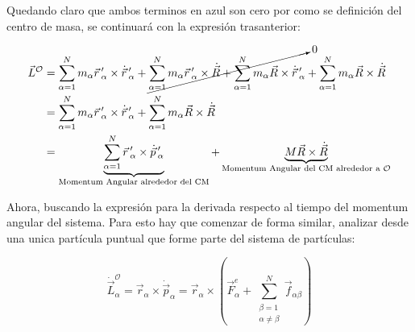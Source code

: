 \documentclass[/home/hernan-barquero/Documents/Apuntes_mecanica_teorica/main.tex]{subfiles}
\begin{document}
	Quedando claro que ambos terminos en azul son cero por como se definición del centro de masa, se continuará con la expresión trasanterior:

	\begin{align*}
		\vec{L}^{\mathcal{O}} &= \sum_{\alpha =1}^{N} m_{\alpha} {\vec{r}}\,'_{\alpha} \times {\dot{\vec{r}}}\,'_{\alpha} + \cancelto{0}{\sum_{\alpha =1}^{N} m_{\alpha} {\vec{r}}\,'_{\alpha} \times \dot{\vec{R}} + \sum_{\alpha =1}^{N} m_{\alpha} \vec{R} \times {\dot{\vec{r}}}\,'_{\alpha}} + \sum_{\alpha =1}^{N} m_{\alpha}  \vec{R} \times \dot{\vec{R}} \\ 
		& = \sum_{\alpha =1}^{N} m_{\alpha} {\vec{r}}\,'_{\alpha} \times {\dot{\vec{r}}}\,'_{\alpha} + \sum_{\alpha =1}^{N} m_{\alpha}  \vec{R} \times \dot{\vec{R}} \\ 
		& = \underbrace{\sum_{\alpha =1}^{N} {\vec{r}}\,'_{\alpha} \times {\dot{\vec{p}}}\,'_{\alpha}}_{\textup{Momentum Angular alrededor del CM}} + \underbrace{M \vec{R} \times \dot{\vec{R}}}_{\textup{Momentum Angular del CM alrededor a $\mathcal{O}$}}
	\end{align*}

	Ahora, buscando la expresión para la derivada respecto al tiempo del momentum angular del sistema. Para esto hay que comenzar de forma similar, analizar desde una unica partícula puntual que forme parte del sistema de partículas:

	\begin{equation*}
		\dot{\vec{L}}_{\alpha}^{\mathcal{O}} = \vec{r}_{\alpha} \times \dot{\vec{p}}_{\alpha} = \vec{r}_{\alpha} \times \left(\vec{F}_{\alpha}^{e} + \sum_{\left . \begin{matrix} \beta = 1\\ \alpha \neq \beta \end{matrix} \right .}^{N} \vec{f}_{\alpha \beta}\right)
	\end{equation*}
\end{document}
